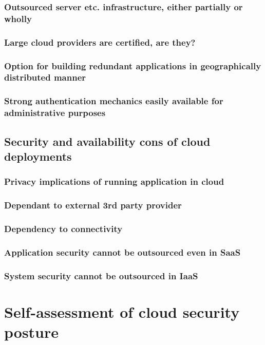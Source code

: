 \documentclass{article}
\begin{document}
\subsubsection{Outsourced server etc. infrastructure, either partially or wholly}
\blindtext[2]
\subsubsection{Large cloud providers are certified, are they?}
\blindtext[2]
\subsubsection{Option for building redundant applications in geographically distributed manner}
\blindtext[2]
\subsubsection{Strong authentication mechanics easily available for administrative purposes}
\blindtext[2]
\subsection{Security and availability cons of cloud deployments}
\blindtext[2]
\subsubsection{Privacy implications of running application in cloud}
\blindtext[2]
\subsubsection{Dependant to external 3rd party provider}
\blindtext[2]
\subsubsection{Dependency to connectivity}
\blindtext[2]
\subsubsection{Application security cannot be outsourced even in SaaS}
\blindtext[2]
\subsubsection{System security cannot be outsourced in IaaS}
\blindtext[2]
\section{Self-assessment of cloud security posture}
\blindtext[2]
\end{document}
